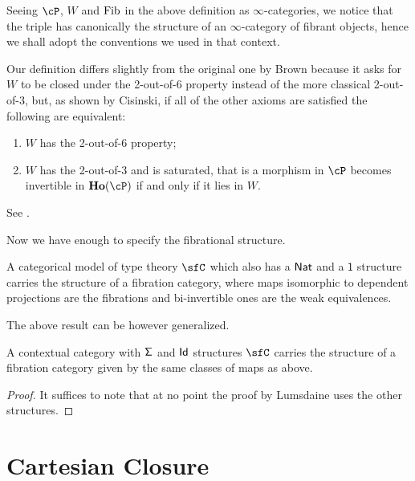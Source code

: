 \begin{rmk}
  Seeing $\cP$, $W$ and $\operatorname{Fib}$ in the above definition as $\infty$-categories, we
  notice that the triple has canonically the structure of an $\infty$-category
  of fibrant objects, hence we shall adopt the conventions we used in that
  context.
\end{rmk}

\begin{rmk}
  Our definition differs slightly from the original one by Brown
  because it asks for $W$ to be closed under the 2-out-of-6 property
  instead of the more classical 2-out-of-3, but, as shown by Cisinski, if all of
  the other axioms are satisfied the following are equivalent:
  \begin{enumerate}
    \item $W$ has the 2-out-of-6 property;
    \item $W$ has the 2-out-of-3 and is saturated, that is a morphism in $\cP$
      becomes invertible in $\ho(\cP)$ if and only if it lies in $W$.
  \end{enumerate}
  See \cite[Thm.~7.2.7]{RB06}.
\end{rmk}

Now we have enough to specify the fibrational structure.

\begin{prop}
  A categorical model of type theory $\sfC$ which also has a $\operatorname{\mathsf{Nat}}$ and a
  $\mathsf{1}$
  structure carries the structure of a fibration category, where maps isomorphic
  to dependent projections are the fibrations and bi-invertible ones are the
  weak equivalences.
\end{prop}

The above result can be however generalized.

\begin{prop}\label{fibcat}
  A contextual category with $\operatorname{\mathsf{\Sigma}}$ and $\operatorname{\mathsf{Id}}$ structures $\sfC$ carries the
  structure of a fibration category given by the same classes of maps as above.
\end{prop}
\begin{proof}
  It suffices to note that at no point the proof by Lumsdaine uses the other
  structures.
\end{proof}

\section{Cartesian Closure}

